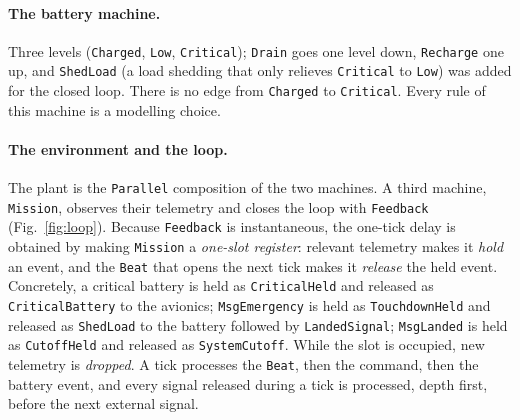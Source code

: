 \documentclass[review]{jfp-epi}
\newcommand{\code}[1]{\texttt{#1}}
\begin{document}
\paragraph{The battery machine.} Three levels (\code{Charged}, \code{Low}, \code{Critical}); \code{Drain} goes one level down, \code{Recharge} one up, and \code{ShedLoad} (a load shedding that only relieves \code{Critical} to \code{Low}) was added for the closed loop. There is no edge from \code{Charged} to \code{Critical}. Every rule of this machine is a modelling choice.

\paragraph{The environment and the loop.} The plant is the \code{Parallel} composition of the two machines. A third machine, \code{Mission}, observes their telemetry and closes the loop with \code{Feedback} (Fig.~\ref{fig:loop}). Because \code{Feedback} is instantaneous, the one-tick delay is obtained by making \code{Mission} a \emph{one-slot register}: relevant telemetry makes it \emph{hold} an event, and the \code{Beat} that opens the next tick makes it \emph{release} the held event. Concretely, a critical battery is held as \code{CriticalHeld} and released as \code{CriticalBattery} to the avionics; \code{MsgEmergency} is held as \code{TouchdownHeld} and released as \code{ShedLoad} to the battery followed by \code{LandedSignal}; \code{MsgLanded} is held as \code{CutoffHeld} and released as \code{SystemCutoff}. While the slot is occupied, new telemetry is \emph{dropped}. A tick processes the \code{Beat}, then the command, then the battery event, and every signal released during a tick is processed, depth first, before the next external signal.
\end{document}
